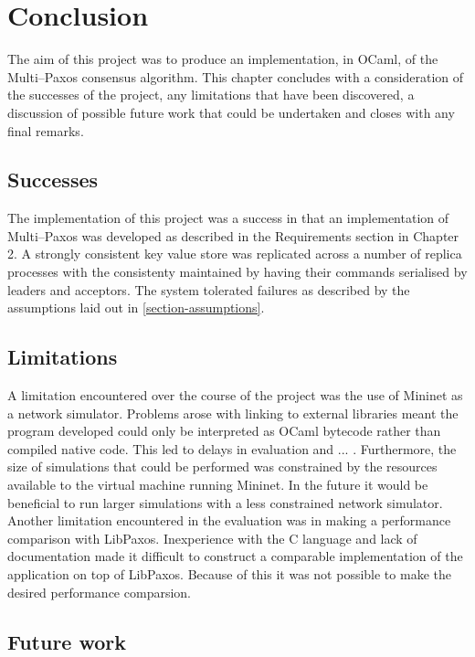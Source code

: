 \chapter{Conclusion}

The aim of this project was to produce an implementation, in OCaml, of the Multi--Paxos consensus algorithm. This chapter concludes with a consideration of the successes of the project, any limitations that have been discovered, a discussion of possible future work that could be undertaken and closes with any final remarks.

\section{Successes}

The implementation of this project was a success in that an implementation of Multi--Paxos was developed as described in the Requirements section in Chapter 2. A strongly consistent key value store was replicated across a number of replica processes with the consistenty maintained by having their commands serialised by leaders and acceptors. The system tolerated failures as described by the assumptions laid out in \ref{section-assumptions}.

\section{Limitations}

A limitation encountered over the course of the project was the use of Mininet as a network simulator. Problems arose with linking to external libraries meant the program developed could only be interpreted as OCaml bytecode rather than compiled native code. This led to delays in evaluation and ... . Furthermore, the size of simulations that could be performed was constrained by the resources available to the virtual machine running Mininet. In the future it would be beneficial to run larger simulations with a less constrained network simulator. \\

Another limitation encountered in the evaluation was in making a performance comparison with LibPaxos. Inexperience with the C language and lack of documentation made it difficult to construct a comparable implementation of the application on top of LibPaxos. Because of this it was not possible to make the desired performance comparsion.

\section{Future work}

